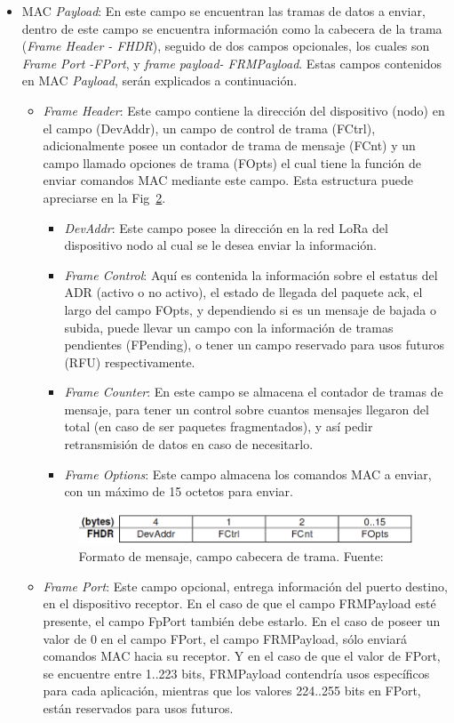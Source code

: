 \begin{justify}
\begin{itemize}
\begin{figure}[!ht]
\label{msg:1}
\end{figure}
\item MAC \textit{Payload}: En este campo se encuentran las tramas de datos a enviar, dentro de este campo se encuentra información como la cabecera de la trama (\textit{Frame Header - FHDR}), seguido de dos campos opcionales, los cuales son \textit{Frame Port -FPort}, y \textit{frame payload- FRMPayload}. Estas campos contenidos en MAC \textit{Payload}, serán explicados a continuación.
\begin{itemize}
\item \textit{Frame Header}: Este campo contiene la dirección del dispositivo (nodo) en el campo (DevAddr), un campo de control de trama (FCtrl), adicionalmente posee un contador de trama de mensaje (FCnt) y un campo llamado opciones de trama (FOpts) el cual tiene la función de enviar comandos MAC mediante este campo. Esta estructura puede apreciarse en la Fig~\ref{msg:2}.\\
\begin{itemize}
\item \textit{DevAddr}: Este campo posee la dirección en la red LoRa del dispositivo nodo al cual se le desea enviar la información.
\item \textit{Frame Control}: Aquí es contenida la información sobre el estatus del ADR (activo o no activo), el estado de llegada del paquete \gls{ack}, el largo del campo FOpts, y dependiendo si es un mensaje de bajada o subida, puede llevar un campo con la información de tramas pendientes (FPending), o tener un campo reservado para usos futuros (RFU) respectivamente.
\item \textit{Frame Counter}: En este campo se almacena el contador de tramas de mensaje, para tener un control sobre cuantos mensajes llegaron del total (en caso de ser paquetes fragmentados), y así pedir retransmisión de datos en caso de necesitarlo.
\item \textit{Frame Options}: Este campo almacena los comandos MAC a enviar, con un máximo de 15 octetos para enviar.
\end{itemize}
\begin{figure}[!ht]
\includegraphics[scale=0.5]{images/mensaje2}
\caption{Formato de mensaje, campo cabecera de trama. Fuente:~\cite{Sornin}}
\label{msg:2}
\end{figure}
\item \textit{Frame Port}: Este campo opcional, entrega información del puerto destino, en el dispositivo receptor. En el caso de que el campo FRMPayload esté presente, el campo FpPort también debe estarlo. En el caso de poseer un valor de 0 en el campo FPort, el campo FRMPayload, sólo enviará comandos MAC hacia su receptor. Y en el caso de que el valor de FPort, se encuentre entre 1..223 bits, FRMPayload contendría usos específicos para cada aplicación, mientras que los valores 224..255 bits en FPort, están reservados para usos futuros.

\end{itemize}
\end{itemize}
\end{justify}
